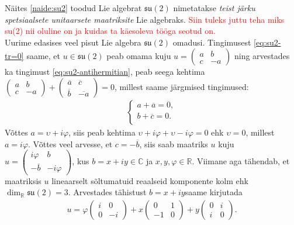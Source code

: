 \documentclass[a4paper,12pt]{article}
\theoremstyle{plain}
\theoremstyle{definition}
\numberwithin{equation}{section}
\begin{document}
Näites \ref{naide:su2} toodud Lie algebrat $\mathfrak{su}\left(2\right)$ nimetatakse \emph{teist järku spetsiaalsete unitaarsete maatriksite} Lie algebraks. \textcolor{red}{Siin tuleks juttu teha miks su(2) nii oluline on ja kuidas ta käesoleva tööga seotud on.} \\
Uurime edasises veel pisut Lie algebra $\mathfrak{su}\left(2\right)$ omadusi. Tingimusest \ref{eq:su2-tr=0} saame, et $u \in \mathfrak{su}\left(2\right)$ peab omama kuju $u = \begin{pmatrix} a & b \\ c & -a\end{pmatrix}$ ning arvestades ka tingimust \ref{eq:su2-antihermitian}, peab seega kehtima $\begin{pmatrix} a & b \\ c & -a\end{pmatrix} + \begin{pmatrix} \overline{a} & \overline{c} \\ \overline{b} & \overline{-a} \end{pmatrix} = 0$, millest saame järgmised tingimused:
\begin{align*}
\begin{cases}
    a + \overline{a} = 0, \\
    b + \overline{c} = 0. \\
  \end{cases}
\end{align*}
Võttes $a = \upsilon + i\varphi$, siis peab kehtima $\upsilon + i\varphi + \upsilon - i\varphi = 0$ ehk $\upsilon = 0$, millest $a = i\varphi$. Võttes veel arvesse, et $c = -\overline{b}$, siis saab maatriks $u$ kuju $u = \begin{pmatrix} i\varphi & b \\ -\overline{b} & -i\varphi \end{pmatrix}$, kus $b=x+iy \in \mathbb{C}$ ja $x, y, \varphi \in \mathbb{R}$. Viimane aga tähendab, et maatriksis $u$ lineaarselt sõltumatuid reaalseid komponente kolm ehk $\dim_{\mathbb{R}} \mathfrak{su}\left(2\right) = 3$. Arvestades tähistust $b = x + iy$saame kirjutada
\begin{align*}
u = \varphi \begin{pmatrix} i & 0 \\ 0 & -i \end{pmatrix} + x \begin{pmatrix} 0 & 1 \\ -1 & 0 \end{pmatrix} + y \begin{pmatrix} 0 & i \\ i & 0 \end{pmatrix}.
\end{align*}
\end{document}
